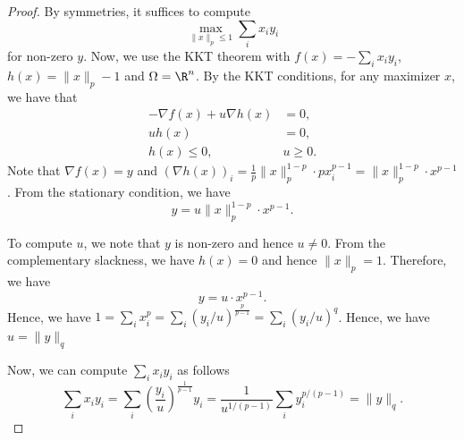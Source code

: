 \begin{proof}
By symmetries, it suffices to compute
\[
\max_{\|x\|_{p}\leq1}\sum_{i}x_{i}y_{i}
\]
for non-zero $y$. Now, we use the KKT theorem with $f(x)=-\sum_{i}x_{i}y_{i}$,
$h(x)=\|x\|_{p}-1$ and $\Omega=\R^{n}$. By the KKT conditions, for
any maximizer $x$, we have that
\begin{align*}
-\nabla f(x)+u\nabla h(x) & =0,\\
uh(x) & =0,\\
h(x)\leq0, & u\geq0.
\end{align*}
Note that $\nabla f(x)=y$ and $(\nabla h(x))_{i}=\frac{1}{p}\|x\|_{p}^{1-p}\cdot px_{i}^{p-1}=\|x\|_{p}^{1-p}\cdot x^{p-1}$.
From the stationary condition, we have
\[
y=u\|x\|_{p}^{1-p}\cdot x^{p-1}.
\]

To compute $u$, we note that $y$ is non-zero and hence $u\neq0$.
From the complementary slackness, we have $h(x)=0$ and hence $\|x\|_{p}=1$.
Therefore, we have
\[
y=u\cdot x^{p-1}.
\]
Hence, we have $1=\sum_{i}x_{i}^{p}=\sum_{i}(y_{i}/u)^{\frac{p}{p-1}}=\sum_{i}(y_{i}/u)^{q}$.
Hence, we have $u=\|y\|_{q}$ 

Now, we can compute $\sum_{i}x_{i}y_{i}$ as follows
\[
\sum_{i}x_{i}y_{i}=\sum_{i}(\frac{y_{i}}{u})^{\frac{1}{p-1}}y_{i}=\frac{1}{u^{1/(p-1)}}\sum_{i}y_{i}^{p/(p-1)}=\|y\|_{q}.
\]
\end{proof}


